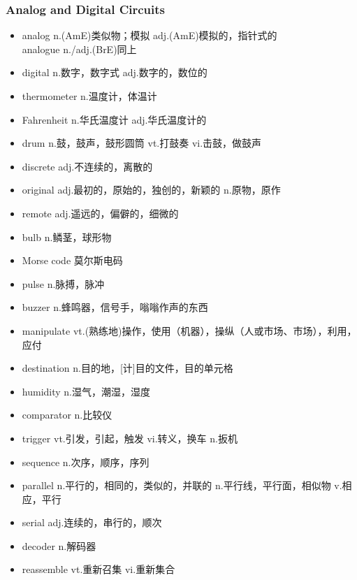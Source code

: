 \documentclass[11pt,a4paper,UTF8,titlepage]{ctexart} %
\begin{document}
    \subsubsection{Analog and Digital Circuits}
    \begin{multicols}{2}
        \begin{itemize}
            \item analog n.(AmE)类似物；模拟 adj.(AmE)模拟的，指针式的\\analogue n./adj.(BrE)同上
            \item digital n.数字，数字式 adj.数字的，数位的
            \item thermometer n.温度计，体温计
            \item Fahrenheit n.华氏温度计 adj.华氏温度计的
            \item drum n.鼓，鼓声，鼓形圆筒 vt.打鼓奏 vi.击鼓，做鼓声
            \item discrete adj.不连续的，离散的
            \item original adj.最初的，原始的，独创的，新颖的 n.原物，原作
            \item remote adj.遥远的，偏僻的，细微的
            \item bulb n.鳞茎，球形物
            \item Morse code 莫尔斯电码
            \item pulse n.脉搏，脉冲
            \item buzzer n.蜂鸣器，信号手，嗡嗡作声的东西
            \item manipulate vt.(熟练地)操作，使用（机器），操纵（人或市场、市场），利用，应付
            \item destination n.目的地，[计]目的文件，目的单元格
            \item humidity n.湿气，潮湿，湿度
            \item comparator n.比较仪
            \item trigger vt.引发，引起，触发 vi.转义，换车 n.扳机
            \item sequence n.次序，顺序，序列
            \item parallel n.平行的，相同的，类似的，并联的 n.平行线，平行面，相似物 v.相应，平行
            \item serial adj.连续的，串行的，顺次
            \item decoder n.解码器
            \item reassemble vt.重新召集 vi.重新集合
        \end{itemize}
    \end{multicols}
\end{document}
